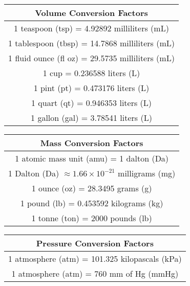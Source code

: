 \documentclass[10pt, roman]{article}
\begin{document}
\begin{minipage}{.5\textwidth}
\centering
\begin{tabular}{|c|}
\hline
\textbf{Volume Conversion Factors} \\
\hline
1 teaspoon (tsp) = 4.92892 milliliters (mL) \\
1 tablespoon (tbsp) = 14.7868 milliliters (mL) \\
1 fluid ounce (fl oz) = 29.5735 milliliters (mL) \\
1 cup = 0.236588 liters (L) \\
1 pint (pt) = 0.473176 liters (L) \\
1 quart (qt) = 0.946353 liters (L) \\
1 gallon (gal) = 3.78541 liters (L) \\
\hline
\end{tabular}

\vspace{10pt}

\noindent
\begin{tabular}{|c|}
\hline
\textbf{Mass Conversion Factors} \\
\hline
1 atomic mass unit (amu) = 1 dalton (Da) \\
1 Dalton (Da) $\approx 1.66 \times 10^{-21}$ milligrams (mg) \\
1 ounce (oz) = 28.3495 grams (g) \\
1 pound (lb) = 0.453592 kilograms (kg) \\
1 tonne (ton) = 2000 pounds (lb) \\
\hline
\end{tabular}

\vspace{10pt}

\noindent
\begin{tabular}{|c|}
\hline
\textbf{Pressure Conversion Factors} \\
\hline
1 atmosphere (atm) = 101.325 kilopascals (kPa) \\
1 atmosphere (atm) = 760 mm of Hg (mmHg) \\
\hline
\end{tabular}
\end{minipage}

\vspace{10pt}
\end{document}

